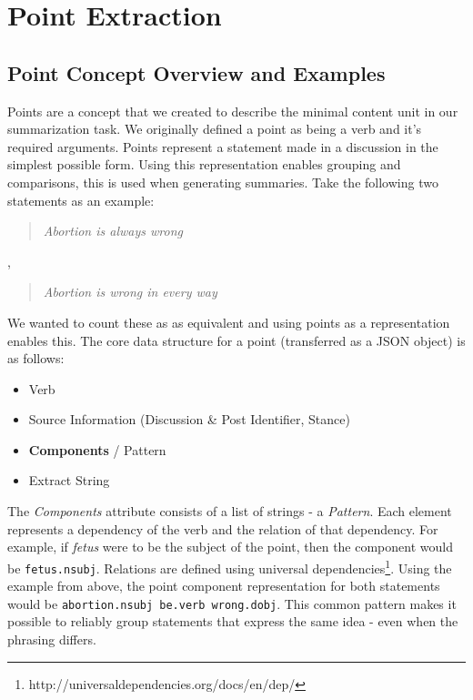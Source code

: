 \chapter{Point Extraction\label{chap:point-extraction}}
  \section{Point Concept Overview and Examples}
    Points are a concept that we created to describe the minimal content unit in our summarization task. We originally defined a point as being a verb and it's required arguments. Points represent a statement made in a discussion in the simplest possible form. Using this representation enables grouping and comparisons, this is used when generating summaries. Take the following two statements as an example:

    \blockquote{\textit{Abortion is always wrong}}, \blockquote{\textit{Abortion is wrong in every way}}

    We wanted to count these as as equivalent and using points as a representation enables this. The core data structure for a point (transferred as a JSON object) is as follows:

    \begin{itemize}
      \item{Verb}
      \item{Source Information (Discussion \& Post Identifier, Stance)}
      \item{\textbf{Components} / Pattern}
      \item{Extract String}
    \end{itemize}

    The \textit{Components} attribute consists of a list of strings - a \textit{Pattern}. Each element represents a dependency of the verb and the relation of that dependency. For example, if \textit{fetus} were to be the subject of the point, then the component would be \texttt{fetus.nsubj}. Relations are defined using universal dependencies\footnote{http://universaldependencies.org/docs/en/dep/}. Using the example from above, the point component representation for both statements would be \texttt{abortion.nsubj be.verb wrong.dobj}. This common pattern makes it possible to reliably group statements that express the same idea - even when the phrasing differs.


